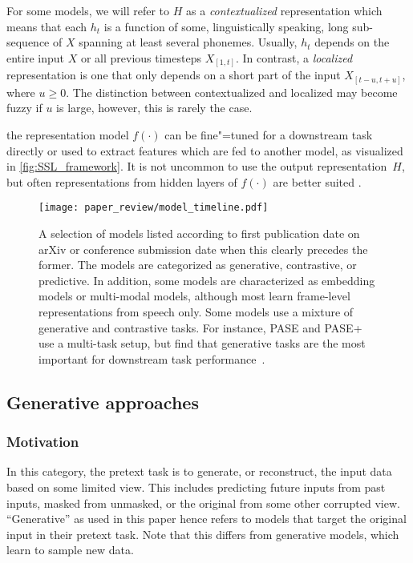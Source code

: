 For some models, we will refer to $H$ as a \emph{contextualized} representation which means that each $h_t$ is a function of some, linguistically speaking, long sub-sequence of $X$ spanning at least several phonemes. Usually, $h_t$ depends on the entire input $X$ or all previous timesteps $X_{[1,t]}$. In contrast, a \emph{localized} representation is one that only depends on a short part of the input $X_{[t - u,t + u]}$, where $u \geq 0$. The distinction between contextualized and localized may become fuzzy if $u$ is large, however, this is rarely the case.

 the representation model $f(\cdot)$ can be fine"=tuned for a downstream task directly or used to extract features which are fed to another model, as visualized in \cref{fig:SSL_framework}. It is not uncommon to use the output representation~$H$, but often representations from hidden layers of $f(\cdot)$ are better suited \parencite{pasad_layerwise_2021}.


\begin{figure*}
    \centering
    \texttt{[image: paper\_review/model\_timeline.pdf]}
	 \caption[Selection of self"=supervised models for speech.]{A selection of models listed according to first publication date
	 on arXiv or conference submission date when this clearly precedes the
	 former. The models are categorized as generative, contrastive, or predictive.
	 In addition, some models are characterized as embedding models or
	 multi-modal models, although most learn frame-level
	 representations from speech only. Some models use a mixture of generative
	 and contrastive tasks. For instance, PASE and PASE+ use a multi-task setup,
	 but find that generative tasks are the most important for downstream
	 task performance~\parencite{pascual_learning_2019}.}
    \label{fig:timeline}
\end{figure*}


 

\subsection{Generative approaches}
\label{sec:generative}

\subsubsection{Motivation}

In this category, the pretext task is to generate, or reconstruct, the input data based on some limited view. This includes predicting future inputs from past inputs, masked from unmasked, or the original from some other corrupted view.  ``Generative'' as used in this paper hence refers to models that target the original input in their pretext task. Note that this differs from generative models, which learn  to sample new data.

